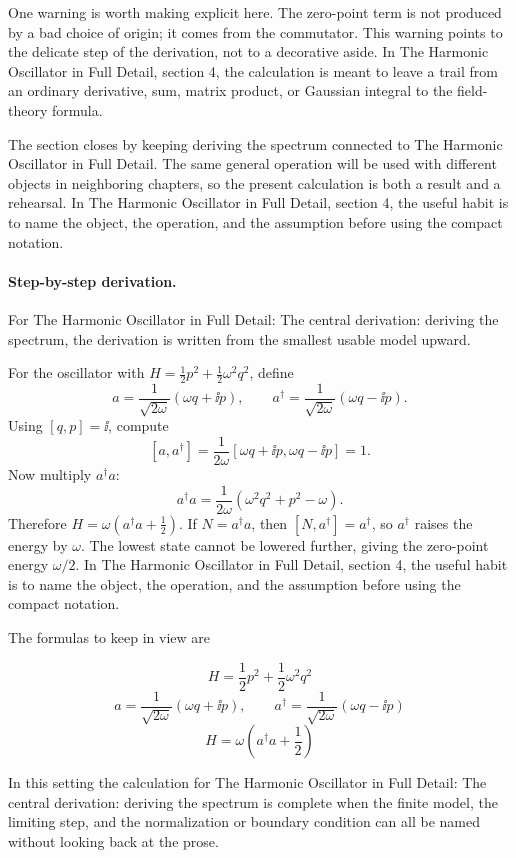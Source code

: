 One warning is worth making explicit here.  The zero-point term is not produced by a bad choice of origin; it comes from the commutator.  This warning points to the delicate step of the derivation, not to a decorative aside.  In The Harmonic Oscillator in Full Detail, section 4, the calculation is meant to leave a trail from an ordinary derivative, sum, matrix product, or Gaussian integral to the field-theory formula.

The section closes by keeping deriving the spectrum connected to The Harmonic Oscillator in Full Detail.  The same general operation will be used with different objects in neighboring chapters, so the present calculation is both a result and a rehearsal.  In The Harmonic Oscillator in Full Detail, section 4, the useful habit is to name the object, the operation, and the assumption before using the compact notation.



\paragraph{Step-by-step derivation.}

For The Harmonic Oscillator in Full Detail: The central derivation: deriving the spectrum, the derivation is written from the smallest usable model upward.

For the oscillator with \(H=\frac12p^2+\frac12\omega^2q^2\), define
\[
  a=\frac{1}{\sqrt{2\omega}}(\omega q+\ii p),\qquad
  a^\dagger=\frac{1}{\sqrt{2\omega}}(\omega q-\ii p).
\]
Using \([q,p]=\ii\), compute
\[
  [a,a^\dagger]
  =
  \frac{1}{2\omega}[\omega q+\ii p,\omega q-\ii p]=1.
\]
Now multiply \(a^\dagger a\):
\[
  a^\dagger a=\frac{1}{2\omega}(\omega^2q^2+p^2-\omega).
\]
Therefore \(H=\omega(a^\dagger a+\frac12)\).  If \(N=a^\dagger a\), then \([N,a^\dagger]=a^\dagger\), so \(a^\dagger\) raises the energy by \(\omega\).  The lowest state cannot be lowered further, giving the zero-point energy \(\omega/2\).  In The Harmonic Oscillator in Full Detail, section 4, the useful habit is to name the object, the operation, and the assumption before using the compact notation.

The formulas to keep in view are

\[
  H=\frac12p^2+\frac12\omega^2q^2
\]
\[
  a=\frac{1}{\sqrt{2\omega}}(\omega q+\ii p),\qquad a^\dagger=\frac{1}{\sqrt{2\omega}}(\omega q-\ii p)
\]
\[
  H=\omega\left(a^\dagger a+\frac12\right)
\]

In this setting the calculation for The Harmonic Oscillator in Full Detail: The central derivation: deriving the spectrum is complete when the finite model, the limiting step, and the normalization or boundary condition can all be named without looking back at the prose.




